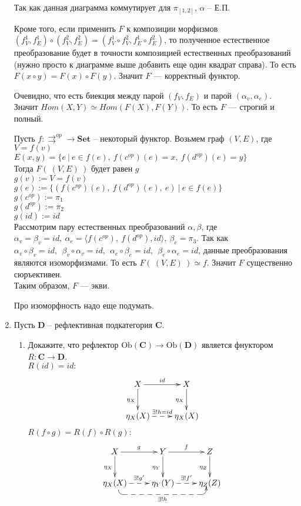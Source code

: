 \documentclass[draft]{article}
\newcommand{\cat}[1]{\mathbf{#1}}
\renewcommand{\C}{\cat{C}}
\newcommand{\D}{\cat{D}}
\newcommand{\Set}{\cat{Set}}
\newcommand{\fs}[1]{\mathrm{#1}}
\newcommand{\Ob}{\fs{Ob}}
\begin{document}
\begin{enumerate}
Так как данная диаграмма коммутирует для $\pi_{[1, 2]}$, $\alpha$ -- Е.П.

Кроме того, если применить $F$ к композиции морфизмов $(f_V^1, f_E^1) \circ (f_V^2, f_E^2) = (f_V^1 \circ f_V^2, f_E^1\circ f_E^2)$, то полученное естественное преобразование будет в точности композицией естественных преобразований (нужно просто к диаграмме выше добавить еще один квадрат справа). То есть $F(x\circ y) = F(x)\circ F(y)$. Значит $F$ --- корректный функтор.

Очевидно, что есть биекция между парой $(f_V, f_E)$ и парой $(\alpha_v, \alpha_e)$. Значит $Hom(X, Y) \simeq Hom(F(X), F(Y))$. То есть $F$ --- строгий и полный.


Пусть $f: \pmb{\rightrightarrows}^{op} \to \Set$ -- некоторый функтор. Возьмем граф $(V, E)$, где \\
$V = f(v)$\\
$E(x, y) = \{e ~|~ e \in f(e),~ f(c^{op})(e) = x,~ f(d^{op})(e) = y\}$\\

Тогда $F(~(V, E)~)$ будет равен $g$\\
$g(v) := V = f(v)$\\
$g(e) := \{(f(c^{op})(e), ~f(d^{op})(e), ~e) ~|~ e \in f(e)\}$\\
$g(c^{op}) := \pi_1$\\
$g(d^{op}) := \pi_2$\\
$g(id) := id$\\

Рассмотрим пару естественных преобразований $\alpha, \beta$, где $\alpha_v  = \beta_v = id,~\alpha_e = \langle f(c^{op}),~f(d^{op}), id \rangle, ~\beta_e = \pi_3$. Так как $\alpha_v \circ \beta_v = id,~~\beta_v \circ \alpha_v = id,~~\alpha_e \circ \beta_e = id,~~\beta_e \circ \alpha_e = id$, данные преобразования являются изоморфизмами. То есть $F(~(V, E)~) \simeq f$. Значит $F$ существенно сюръективен.\\

Таким образом, $F$ --- экви.

Про изоморфность надо еще подумать.

\item Пусть $\D$ -- рефлективная подкатегория $\C$.
\begin{enumerate}
\item Докажите, что рефлектор $\Ob(\C) \to \Ob(\D)$ является фнуктором $R : \C \to \D$.\\

$R(id) = id:$
\[
\xymatrix{
X \ar[r]^{id} \ar[d]_{\eta_X} & X \ar[d]_{\eta_X} \\
\eta_X(X) \ar@{-->}[r]^{\exists! h = id} & \eta_X(X)
}
\]
$R(f\circ g) = R(f) \circ R(g):$
\[
\xymatrix{
X \ar[r]^g \ar[d]_{\eta_X} & Y\ar[r]^f \ar[d]_{\eta_Y} & Z \ar[d]_{\eta_Z}\\
\eta_X(X) \ar@{-->}[r]^{\exists!g'} 
\ar@<1ex>@{-->}`d/10pt`[rr]_{\exists!h}
& \eta_Y(Y) \ar@{-->}[r]^{\exists!f'} & \eta_Z(Z)
}
\]


\end{enumerate}
\end{enumerate}
\end{document}
